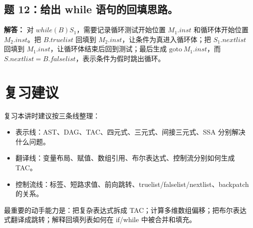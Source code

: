 \documentclass[UTF8,fontset=none,11pt]{ctexart}
\begin{document}
\subsection*{题 12：给出 while 语句的回填思路。}

\textbf{解答：} 对 \(while(B)S_1\)，需要记录循环测试开始位置 \(M_1.inst\) 和循环体开始位置 \(M_2.inst\)。把 \(B.truelist\) 回填到 \(M_2.inst\)，让条件为真进入循环体；把 \(S_1.nextlist\) 回填到 \(M_1.inst\)，让循环体结束后回到测试；最后生成 \(\mathrm{goto}\ M_1.inst\)，而 \(S.nextlist=B.falselist\)，表示条件为假时跳出循环。

\section*{复习建议}

复习本讲时建议按三条线整理：

\begin{itemize}
  \item 表示线：AST、DAG、TAC、四元式、三元式、间接三元式、SSA 分别解决什么问题。
  \item 翻译线：变量布局、赋值、数组引用、布尔表达式、控制流分别如何生成 TAC。
  \item 控制流线：标签、短路求值、前向跳转、truelist/falselist/nextlist、backpatch 的关系。
\end{itemize}

最重要的动手能力是：把复杂表达式拆成 TAC；计算多维数组偏移；把布尔表达式翻译成跳转；解释回填列表如何在 if/while 中被合并和填充。
\end{document}
